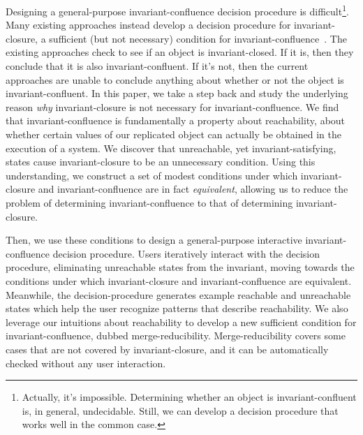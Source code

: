 Designing a general-purpose invariant-confluence decision procedure is
difficult\footnote{Actually, it's impossible. Determining whether an object is
invariant-confluent is, in general, undecidable. Still, we can develop a
decision procedure that works well in the common case.}. Many existing
approaches instead develop a decision procedure for invariant-closure, a
sufficient (but not necessary) condition for
invariant-confluence~\cite{li2012making, li2014automating}. The existing
approaches check to see if an object is invariant-closed. If it is, then they
conclude that it is also invariant-confluent. If it's not, then the current
approaches are unable to conclude anything about whether or not the object is
invariant-confluent. In this paper, we take a step back and study the
underlying reason \emph{why} invariant-closure is not necessary for
invariant-confluence. We find that invariant-confluence is fundamentally a
property about reachability, about whether certain values of our replicated
object can actually be obtained in the execution of a system. We discover that
unreachable, yet invariant-satisfying, states cause invariant-closure to be an
unnecessary condition. Using this understanding, we construct a set of modest
conditions under which invariant-closure and invariant-confluence are in fact
\emph{equivalent}, allowing us to reduce the problem of determining
invariant-confluence to that of determining invariant-closure.


Then, we use these conditions to design a general-purpose interactive
invariant-confluence decision procedure. Users iteratively interact with the
decision procedure, eliminating unreachable states from the invariant, moving
towards the conditions under which invariant-closure and invariant-confluence
are equivalent. Meanwhile, the decision-procedure generates example reachable
and unreachable states which help the user recognize patterns that describe
reachability. We also leverage our intuitions about reachability to develop a
new sufficient condition for invariant-confluence, dubbed merge-reducibility.
Merge-reducibility covers some cases that are not covered by invariant-closure,
and it can be automatically checked without any user interaction.

